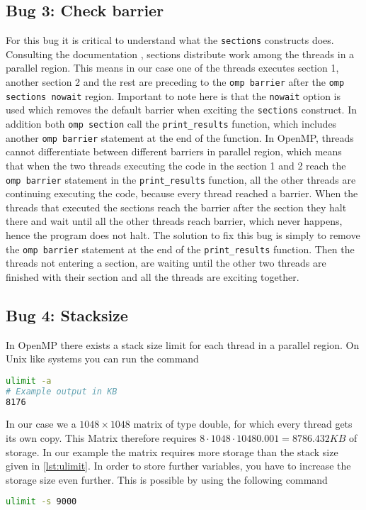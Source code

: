\subsection{Bug 3: Check barrier}
For this bug it is critical to understand what the \texttt{sections} constructs does. Consulting the documentation \cite{noauthor_ibm_2024}, sections distribute work among the threads in a parallel region.
This means in our case one of the threads executes section 1, another section 2 and the rest are preceding to the \texttt{omp barrier} after the \texttt{omp sections nowait} region. Important to note here is that the \texttt{nowait} option is used which removes the default barrier when exciting the \texttt{sections} construct. \newline
In addition both \texttt{omp section} call the \texttt{print\_results} function, which includes another \texttt{omp barrier} statement at the end of the function.\newline
In OpenMP, threads cannot differentiate between different barriers in parallel region, which means that when the two threads executing the code in the section 1 and 2 reach the \texttt{omp barrier} statement in the \texttt{print\_results} function, all the other threads are continuing executing the code, because every thread reached a barrier. When the threads that executed the sections reach the barrier after the section they halt there and wait until all the other threads reach barrier, which never happens, hence the program does not halt.\newline
\newline
The solution to fix this bug is simply to remove the \texttt{omp barrier} statement at the end of the \texttt{print\_results} function. Then the threads not entering a section, are waiting until the other two threads are finished with their section and all the threads are exciting together.
\subsection{Bug 4: Stacksize}
In OpenMP there exists a stack size limit for each thread in a parallel region. 
On Unix like systems you can run the command
\begin{lstlisting}[language=bash, caption=Find current stacksize on Unix-like system, label=lst:ulimit]
ulimit -a
# Example output in KB
8176
\end{lstlisting}
In our case we a $1048 \times 1048$ matrix of type double, for which every thread gets its own copy.
This Matrix therefore requires $ 8 \cdot 1048 \cdot 1048 0.001 = 8786.432 KB$ of storage. In our example the matrix requires more storage than the stack size given in \ref{lst:ulimit}. In order to store further variables, you have to increase the storage size even further. This is possible by using the following command
\begin{lstlisting}[language=bash, caption=Setting new stacksize on Unix-like system]
ulimit -s 9000
\end{lstlisting}

